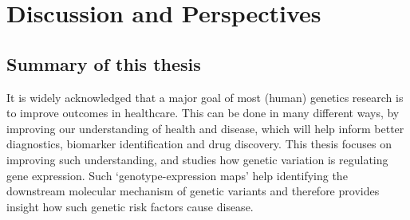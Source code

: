 \chapterfont{\color{Grey}}  %
\sectionfont{\color{Grey}}  %
\subsectionfont{\color{Grey}}  %

\renewcommand\pcolor{Grey}
\renewcommand{\headrule}{\hbox to\headwidth{%
		\color{Grey}\leaders\hrule height \headrulewidth\hfill}} %
\fancyfoot[LE,RO]{\thepage}

{ \Large {} }

\chapter{Discussion and Perspectives}
\chaptermark{}
\label{chap:discussion}



\newpage

\section{Summary of this thesis}
It is widely acknowledged that a major goal of most (human) genetics research is to improve outcomes in healthcare. This can be done in many different ways, by improving our understanding of health and disease\cite{mcguireRoadAheadGenetics2020, claussnitzerBriefHistoryHuman2020e}, which will help inform better diagnostics, biomarker identification and drug discovery. This thesis focuses on improving such understanding, and studies how genetic variation is regulating gene expression. Such ‘genotype-expression maps’ help identifying the downstream molecular mechanism of genetic variants and therefore provides insight how such genetic risk factors cause disease. 

